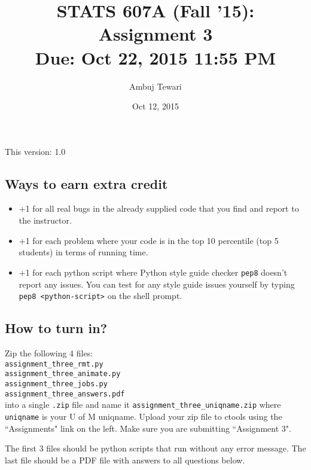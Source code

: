 \documentclass{article}
\begin{document}
\author{Ambuj Tewari}
\title{STATS 607A (Fall '15): Assignment 3\\
Due: Oct 22, 2015 11:55 PM}
\date{Oct 12, 2015}

\maketitle

\begin{center}
This version: 1.0
\end{center}

\subsection*{Ways to earn extra credit}

\begin{itemize}
\item +1 for all real bugs in the already supplied code that you find and report to the instructor.
\item +1 for each problem where your code is in the top 10 percentile (top 5 students) in terms of running time.
\item +1 for each python script where Python style guide checker {\tt pep8} doesn't report any issues. You can test for any style guide issues yourself by typing
{\tt pep8 <python-script>} on the shell prompt.

\end{itemize}

\subsection*{How to turn in?}

Zip the following 4 files:\\
{\tt assignment\_three\_rmt.py} \\
{\tt assignment\_three\_animate.py} \\
{\tt assignment\_three\_jobs.py} \\
{\tt assignment\_three\_answers.pdf} \\
into a single {\tt .zip} file and name it {\tt assignment\_three\_uniqname.zip} where {\tt uniqname} is your U of M uniqname. Upload your zip file to ctools using the ``Assignments" link on the left. Make sure
 you are submitting ``Assignment 3".

The first 3 files should be python scripts that run without any error message. The last file should be a PDF file with answers to all questions below. 
\end{document}
